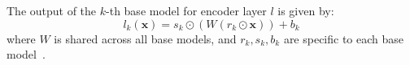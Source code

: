 The output of the \( k \)-th base model for encoder layer \( l \) is given by:
\begin{equation}
l_k(\boldsymbol{x}) = s_k \odot \left( W (r_k \odot \boldsymbol{x}) \right) + b_k
\end{equation}
where \( W \) is shared across all base models, and \( r_k, s_k, b_k \) are specific to each base model~\cite{WenTB20BatchEnsemble}. 





